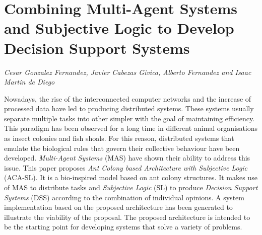 \documentclass[../booklet.tex]{subfiles}
\begin{document}
\section[Combining Multi-Agent Systems and Subjective Logic to Develop Decision Support Systems. {\it Cesar Gonzalez Fernandez, Javier Cabezas Givica, Alberto Fernandez and Isaac Martin de Diego}]{Combining Multi-Agent Systems and Subjective Logic to Develop Decision Support Systems}
   

\begin{center}
  {\it Cesar Gonzalez Fernandez, Javier Cabezas Givica, Alberto Fernandez and Isaac Martin de Diego}
\end{center}

\vskip 0.8cm

Nowadays, the rise of the interconnected computer networks and the increase of processed data have led to producing distributed systems. These systems usually separate multiple tasks into other simpler with the goal of maintaining efficiency. This paradigm has been observed for a long time in different animal organisations as insect colonies and fish shoals. For this reason, distributed systems that emulate the biological rules that govern their collective behaviour have been developed. \emph{Multi-Agent Systems} (MAS) have shown their ability to address this issue. This paper proposes \emph{Ant Colony based Architecture with Subjective Logic} (ACA-SL). It is a bio-inspired model based on ant colony structures. It makes use of MAS to distribute tasks and \emph{Subjective Logic} (SL) to produce \emph{Decision Support Systems} (DSS) according to the combination of individual opinions. A system implementation based on the proposed architecture has been generated to illustrate the viability of the proposal. The proposed architecture is intended to be the starting point for developing systems that solve a variety of problems.

\end{document}

